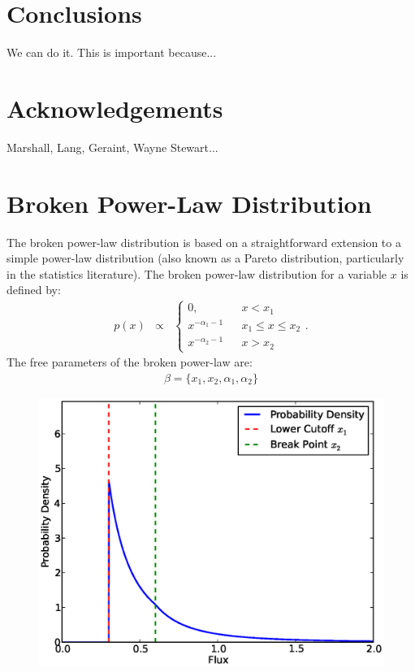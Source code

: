 \documentclass[letterpaper, 11pt]{article}
\begin{document}
\section{Conclusions}
We can do it. This is important because...

\section{Acknowledgements}
Marshall, Lang, Geraint, Wayne Stewart...


\appendix

\section{Broken Power-Law Distribution}\label{power_law}
The broken power-law distribution is based on a straightforward extension
to a simple power-law distribution (also known as a Pareto distribution,
particularly in the statistics literature).
The broken power-law distribution for a variable $x$ is defined by:
\begin{eqnarray}
p(x) &\propto&
\left\{
\begin{array}{lcr}
0, & & x < x_1 \\
x^{-\alpha_1 - 1} & & x_1 \leq x \leq x_2 \\
x^{-\alpha_2 - 1} & & x > x_2
\end{array}
\right.
.
\end{eqnarray}
The free parameters of the broken power-law are:
\begin{eqnarray}
\beta = \{x_1, x_2, \alpha_1, \alpha_2\}
\end{eqnarray}

\begin{figure}
\begin{center}
\includegraphics[scale=0.7]{Figures/broken.eps}
\end{center}
\end{figure}
\end{document}
